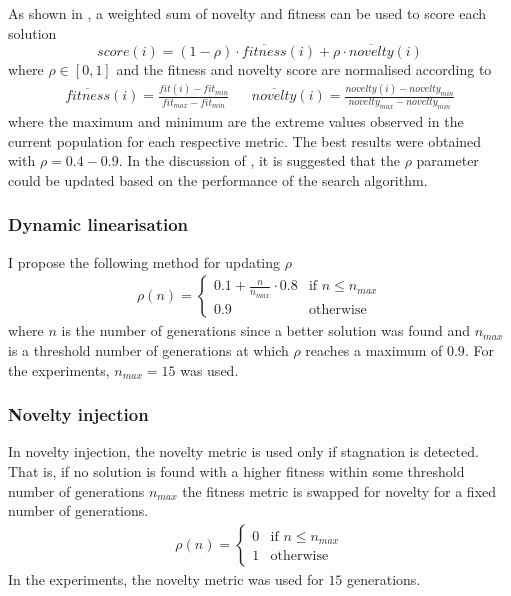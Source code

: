 As shown in \cite{novelty_not_enough}, a weighted sum of novelty and fitness can be used to score each solution
\[
    score(i) = (1-\rho) \cdot \overline{fitness}(i) + \rho \cdot \overline{novelty}(i)
\]
where $\rho \in [0,1]$ and the fitness and novelty score are normalised according to
\begin{align*}
    \overline{fitness}(i) =  \frac{fit(i) - fit_{min}}{fit_{max} - fit_{min}} && \overline{novelty}(i) =  \frac{novelty(i) - novelty_{min}}{novelty_{max} - novelty_{min}}
\end{align*}
where the maximum and minimum are the extreme values observed in the current population for each respective metric.
The best results were obtained with $\rho=0.4-0.9$. In the discussion of \cite{novelty_not_enough}, it is suggested
that the $\rho$ parameter could be updated based on the performance of the search algorithm.

\subsubsection{Dynamic linearisation}
\label{subsubsection:dynamic_linearisation}
I propose the following method for updating $\rho$
\begin{align*}
    \rho(n) =
        \begin{cases}
            0.1 + \frac{n}{n_{max}} \cdot 0.8 & \text{if $n \leq n_{max}$}\\
            0.9 & \text{otherwise}
        \end{cases}
\end{align*}
where $n$ is the number of generations since a better solution was found and
$n_{max}$ is a threshold number of generations at which $\rho$ reaches a maximum
of $0.9$. For the experiments, $n_{max}=15$ was used.

\subsubsection{Novelty injection}
\label{subsection:injection}
In novelty injection, the novelty metric is used only if stagnation is detected. That is, if no solution is found with a
higher fitness within some threshold number of generations $n_{max}$ the fitness metric is swapped for novelty for a fixed
number of generations.
\begin{align*}
    \rho(n) =
        \begin{cases}
            0 & \text{if $n \leq n_{max}$}\\
            1 & \text{otherwise}
        \end{cases}
\end{align*}
In the experiments, the novelty metric was used for $15$ generations.

